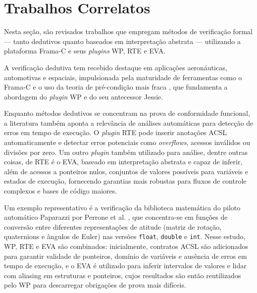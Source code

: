 \documentclass{article}
\begin{document}
\clearpage
\section{Trabalhos Correlatos}\label{chap:projetos_correlatos}
Nesta seção, são revisados trabalhos que empregam métodos de verificação formal — tanto dedutivos quanto baseados em interpretação abstrata — utilizando a plataforma Frama-C e seus \emph{plugins} WP,
RTE e EVA. 


A verificação dedutiva tem recebido destaque em aplicações aeronáuticas, automotivas e espaciais, impulsionada pela maturidade de ferramentas como o Frama-C e o uso da teoria de pré-condição mais
fraca \cite{hoare1969axiomatic,dijkstra1970ewd249}, que fundamenta a abordagem do \emph{plugin} WP e do seu antecessor Jessie.

Enquanto métodos dedutivos se concentram na prova de conformidade funcional, a literatura também aponta a relevância de análises automáticas para detecção de erros em tempo de execução. O
\emph{plugin} RTE pode inserir anotações ACSL automaticamente e detectar erros potenciais como \emph{overflows}, acessos inválidos ou divisões por zero. Um outro \emph{plugin} também utilizado para análise, dentre outras coisas, de RTE é o EVA,
baseado em interpretação abstrata \cite{framaC_eva_manual} e capaz de inferir, além de acessos a ponteiros nulos, conjuntos de valores
possíveis para variáveis e estados de execução, fornecendo garantias mais robustas para fluxos de controle complexos e bases de código maiores.


Um exemplo representativo é a verificação da biblioteca
matemática do piloto automático Paparazzi por Perrone et al. \cite{perrone2016verifying}, que concentra-se em funções de conversão entre diferentes representações de atitude (matriz de rotação,
quaternions e ângulos de Euler) nas versões \texttt{float}, \texttt{double} e \texttt{int}. Nesse estudo, WP, RTE e EVA são combinados: inicialmente, contratos ACSL são adicionados para garantir
validade de ponteiros, domínio de variáveis e ausência de erros em tempo de execução, e o EVA é utilizado para inferir intervalos de valores e lidar com aliasing em estruturas e ponteiros, cujos
resultados são então reutilizados pelo WP para descarregar obrigações de prova mais difíceis. 
\end{document}
